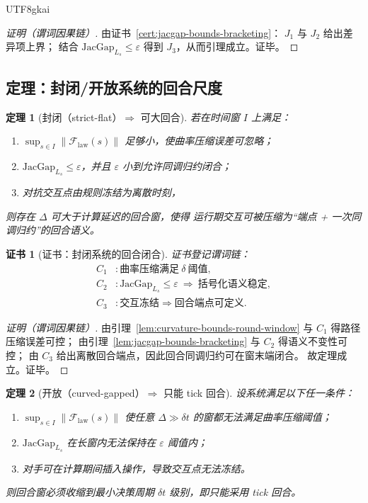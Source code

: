\documentclass[12pt]{article}
\newtheorem{theorem}{定理}[section]
\newtheorem{Certificate}{证书}[section]
\newcommand{\GZLCurv}{\ensuremath{\mathcal{F}_{\mathrm{law}}}}
\newcommand{\JacGap}{\ensuremath{\mathrm{JacGap}}} %
\begin{document}
\begin{CJK*}{UTF8}{gkai}
\begin{proof}[证明（谓词因果链）]
由证书~\ref{cert:jacgap-bounds-bracketing}：
$J_1$ 与 $J_2$ 给出差异项上界；
结合 $\JacGap_{L_s}\le\varepsilon$ 得到 $J_3$，从而引理成立。证毕。
\end{proof}

\subsection{定理：封闭/开放系统的回合尺度}
\label{sec:round-window-theorems}

\begin{theorem}[封闭（strict-flat）$\Rightarrow$ 可大回合]
\label{thm:closed-system-large-round}
若在时间窗 $I$ 上满足：
\begin{enumerate}
  \item $\sup_{s\in I}\|\GZLCurv(s)\|$ 足够小，使曲率压缩误差可忽略；
  \item $\JacGap_{L_s}\le\varepsilon$，并且 $\varepsilon$ 小到允许同调归约闭合；
  \item 对抗交互点由规则冻结为离散时刻，
\end{enumerate}
则存在 $\Delta$ 可大于计算延迟的回合窗，使得
运行期交互可被压缩为“端点 + 一次同调归约”的回合语义。
\end{theorem}

\begin{Certificate}[证书：封闭系统的回合闭合]
\label{cert:closed-system-large-round}
证书登记谓词链：
\[
\begin{aligned}
  C_1 &: \text{曲率压缩满足}\ \delta\ \text{阈值},\\
  C_2 &: \JacGap_{L_s}\le\varepsilon\ \Rightarrow\ \text{括号化语义稳定},\\
  C_3 &: \text{交互冻结}\Rightarrow \text{回合端点可定义}.
\end{aligned}
\]
\end{Certificate}

\begin{proof}[证明（谓词因果链）]
由引理~\ref{lem:curvature-bounds-round-window} 与 $C_1$ 得路径压缩误差可控；
由引理~\ref{lem:jacgap-bounds-bracketing} 与 $C_2$ 得语义不变性可控；
由 $C_3$ 给出离散回合端点，因此回合同调归约可在窗末端闭合。
故定理成立。证毕。
\end{proof}

\begin{theorem}[开放（curved-gapped）$\Rightarrow$ 只能 tick 回合]
\label{thm:open-system-tick-round}
设系统满足以下任一条件：
\begin{enumerate}
  \item $\sup_{s\in I}\|\GZLCurv(s)\|$ 使任意 $\Delta\gg\delta t$ 的窗都无法满足曲率压缩阈值；
  \item $\JacGap_{L_s}$ 在长窗内无法保持在 $\varepsilon$ 阈值内；
  \item 对手可在计算期间插入操作，导致交互点无法冻结。
\end{enumerate}
则回合窗必须收缩到最小决策周期 $\delta t$ 级别，即只能采用 tick 回合。
\end{theorem}


\end{CJK*}
\end{document}
